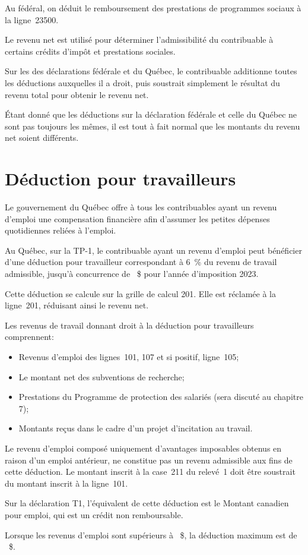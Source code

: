 Au fédéral, on déduit le remboursement des prestations de programmes sociaux à la ligne~23500.

Le revenu net est utilisé pour déterminer l'admissibilité du contribuable à certains crédits d'impôt et prestations sociales.

\begin{note}
	Sur les des déclarations fédérale et du Québec, le contribuable additionne toutes les déductions auxquelles il a droit, puis soustrait simplement le résultat du revenu total pour obtenir le revenu net.
	
	Étant donné que les déductions sur la déclaration fédérale et celle du Québec ne sont pas toujours les mêmes, il est tout à fait normal que les montants du revenu net soient différents.
\end{note}



\section{Déduction pour travailleurs}
\begin{intro}
	Le gouvernement du Québec offre à tous les contribuables ayant un revenu d'emploi une compensation financière afin d'assumer les petites dépenses quotidiennes reliées à l'emploi.
\end{intro}

Au Québec, sur la TP-1, le contribuable ayant un revenu d'emploi peut bénéficier d'une déduction pour travailleur correspondant à 6~\% du revenu de travail admissible, jusqu'à concurrence de ~\$ pour l'année d'imposition 2023. 

Cette déduction se calcule sur la grille de calcul 201. Elle est réclamée à la ligne~201, réduisant ainsi le revenu net.

Les revenus de travail donnant droit à la déduction pour travailleurs comprennent:
\begin{itemize}
	\item Revenus d'emploi des lignes~101, 107 et si positif, ligne~105;
	\item Le montant net des subventions de recherche;
	\item Prestations du Programme de protection des salariés (sera discuté au chapitre 7);
	\item Montants reçus dans le cadre d'un projet d'incitation au travail.
\end{itemize}
\begin{note}
	Le revenu d'emploi composé uniquement d'avantages imposables obtenus en raison d'un emploi antérieur, ne constitue pas un revenu admissible aux fins de cette déduction. Le montant inscrit à la case~211 du relevé~1 doit être soustrait du montant inscrit à la ligne~101.
\end{note}
Sur la déclaration T1, l'équivalent de cette déduction est le Montant canadien pour emploi, qui est un crédit non remboursable.
\begin{note}
	Lorsque les revenus d'emploi sont supérieurs à ~\$, la déduction maximum est de ~\$.
\end{note}



